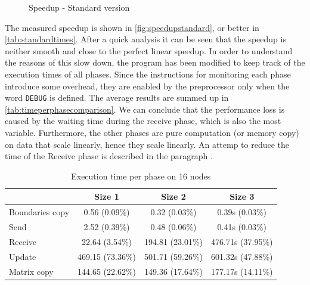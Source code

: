 \documentclass{article}
\begin{document}
\begin{figure}
\centering
{}
\caption{Speedup - Standard version}
\label{fig:speedupstandard}
\end{figure}
The measured speedup is shown in \autoref{fig:speedupstandard}, or better in \autoref{tab:standardtimes}. After a quick analysis it can be seen that the speedup is neither smooth and close to the perfect linear speedup. In order to understand the reasons of this slow down, the program has been modified to keep track of the execution times of all phases. Since the instructions for monitoring each phase introduce some overhead, they are enabled by the preprocessor only when the word \texttt{DEBUG} is defined. The average results are summed up in \autoref{tab:timeperphasecomparison}. We can conclude that the performance loss is caused by the waiting time during the receive phase, which is also the most variable. Furthermore, the other phases are pure computation (or memory copy) on data that scale linearly, hence they scale linearly. An attemp to reduce the time of the Receive phase is described in the paragraph .


\begin{table}
\centering
\begin{tabular}{|l|c|c|c|}
\hline
& Size 1 & Size 2 & Size 3 \\
\hline
Boundaries copy & 0.56 (0.09\%) & 0.32 (0.03\%) & 0.39s (0.03\%) \\
\hline
Send & 2.52 (0.39\%) & 0.48 (0.06\%) & 0.41s (0.03\%) \\
\hline
Receive & 22.64 (3.54\%) & 194.81 (23.01\%) & 476.71s (37.95\%) \\
\hline
Update & 469.15 (73.36\%) & 501.71 (59.26\%) & 601.32s (47.88\%) \\
\hline
Matrix copy & 144.65 (22.62\%) & 149.36 (17.64\%) & 177.17s (14.11\%) \\
\hline
\end{tabular}
\caption{Execution time per phase on 16 nodes} \label{tab:timeperphasecomparison}
\end{table}
\end{document}
